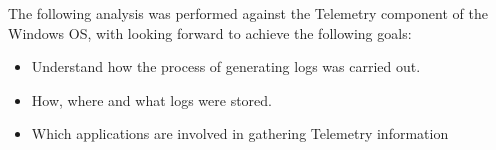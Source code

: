 The following analysis was performed against the Telemetry component of the Windows OS, with looking forward to achieve the following goals:
\begin{itemize}
    \item Understand how the process of generating logs was carried out.
    \item How, where and what logs were stored.
    \item Which applications are involved in gathering Telemetry information
\end{itemize}

